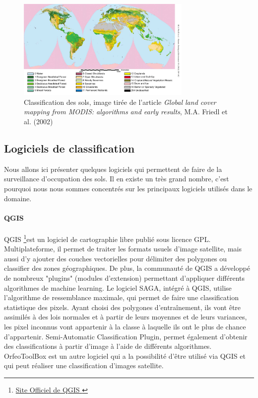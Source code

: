 \documentclass[a4paper,10pt]{article}
\begin{document}
\begin{figure}[H]
  \centering
    \includegraphics[width=0.75\textwidth]{classifSols.png}
  \caption{Classification des sols, image tirée de l'article \textit{Global land cover mapping from MODIS: algorithms and early results}, M.A. Friedl et al. (2002)}
  \label{fig:clSols}
\end{figure}

\subsection{Logiciels de classification}
Nous allons ici présenter quelques logiciels qui permettent de faire de la surveillance d'occupation des sols. Il en existe un très grand nombre, c'est pourquoi nous nous sommes concentrés sur les principaux logiciels utilisés dans le domaine.
\paragraph{QGIS} 
\paragraph{}
QGIS \footnote{\href{http://www.qgis.org}{Site Officiel de QGIS }}est un logiciel de cartographie libre publié sous licence GPL. Multiplateforme, il permet de traiter les formats usuels d'image satellite, mais aussi d'y ajouter des couches vectorielles pour délimiter des polygones ou classifier des zones géographiques.
De plus, la communauté de QGIS a développé de nombreux "plugins" (modules d'extension) permettant d'appliquer différents algorithmes de machine learning.\newline
Le logiciel SAGA, intégré à QGIS, utilise l'algorithme de ressemblance maximale, qui permet de faire une classification statistique des pixels. Ayant choisi des polygones d'entraînement, ils vont être assimilés à des lois normales et à partir de leurs moyennes et de leurs variances, les pixel inconnus vont appartenir à la classe à laquelle ils ont le plus de chance d'appartenir.
Semi-Automatic Classification Plugin, permet également d'obtenir des classifications à partir d'image à l'aide de différents algorithmes.
OrfeoToolBox est un autre logiciel qui a la possibilité d'être utilisé via QGIS et qui peut réaliser une classification d'images satellite.
\end{document}
